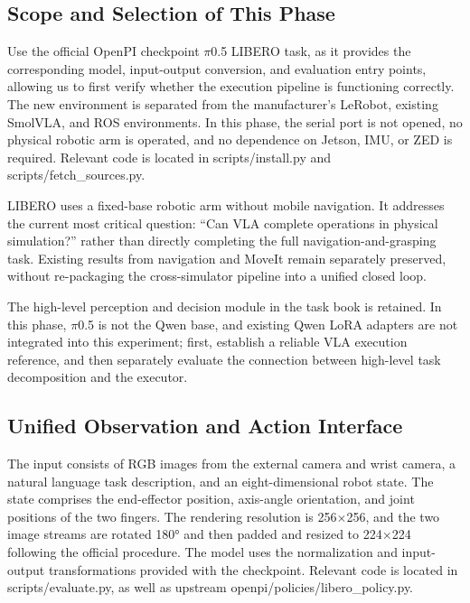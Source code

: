\subsection{Scope and Selection of This Phase}\label{s08-detail-1}

Use the official OpenPI checkpoint \(\pi\)0.5 LIBERO task, as it provides the corresponding model, input-output conversion, and evaluation entry points, allowing us to first verify whether the execution pipeline is functioning correctly. The new environment is separated from the manufacturer's LeRobot, existing SmolVLA, and ROS environments. In this phase, the serial port is not opened, no physical robotic arm is operated, and no dependence on Jetson, IMU, or ZED is required. Relevant code is located in scripts/install.py and scripts/fetch\_sources.py.

LIBERO uses a fixed-base robotic arm without mobile navigation. It addresses the current most critical question: ``Can VLA complete operations in physical simulation?'' rather than directly completing the full navigation-and-grasping task. Existing results from navigation and MoveIt remain separately preserved, without re-packaging the cross-simulator pipeline into a unified closed loop.

The high-level perception and decision module in the task book is retained. In this phase, \(\pi\)0.5 is not the Qwen base, and existing Qwen LoRA adapters are not integrated into this experiment; first, establish a reliable VLA execution reference, and then separately evaluate the connection between high-level task decomposition and the executor.

\subsection{Unified Observation and Action Interface}\label{s08-detail-2}

The input consists of RGB images from the external camera and wrist camera, a natural language task description, and an eight-dimensional robot state. The state comprises the end-effector position, axis-angle orientation, and joint positions of the two fingers. The rendering resolution is 256\(\times\)256, and the two image streams are rotated 180° and then padded and resized to 224\(\times\)224 following the official procedure. The model uses the normalization and input-output transformations provided with the checkpoint. Relevant code is located in scripts/evaluate.py, as well as upstream openpi/policies/libero\_policy.py.

